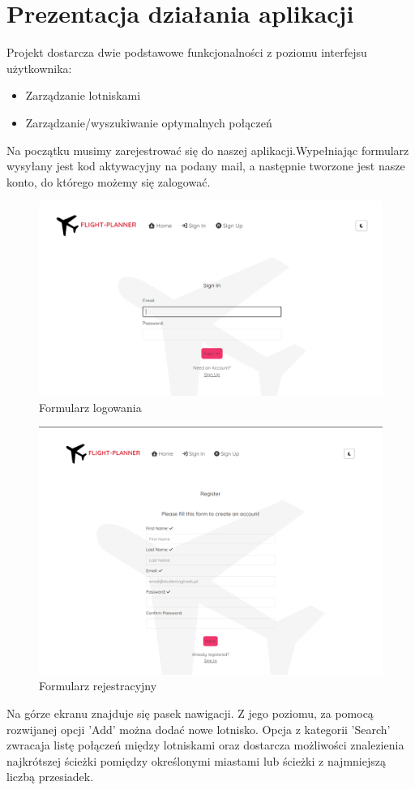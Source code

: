 \documentclass[12pt]{article}
\begin{document}
\section{Prezentacja działania aplikacji}
Projekt dostarcza dwie podstawowe funkcjonalności z poziomu interfejsu
użytkownika: 
\begin{itemize}
    \item Zarządzanie lotniskami
    \item Zarządzanie/wyszukiwanie optymalnych połączeń
\end{itemize}
Na początku musimy zarejestrować się do naszej aplikacji.Wypełniając formularz wysyłany jest kod aktywacyjny na podany mail, a następnie tworzone jest nasze konto, do którego możemy się zalogować.\\
\begin{figure}[!ht]
    \centering
    \includegraphics[width=0.6\linewidth]{1} 
    \caption{Formularz logowania}
\end{figure}
\begin{figure}[!ht]
    \centering
    \includegraphics[width=0.7\linewidth]{2} 
    \caption{Formularz rejestracyjny}
\end{figure}
\newpage
Na górze ekranu znajduje się pasek nawigacji. Z jego poziomu, za pomocą rozwijanej opcji 'Add' można dodać nowe lotnisko. Opcja z kategorii 'Search' zwracaja listę połączeń między lotniskami oraz dostarcza możliwości znalezienia najkrótszej ścieżki pomiędzy określonymi miastami lub ścieżki z najmniejszą liczbą przesiadek.
\end{document}
